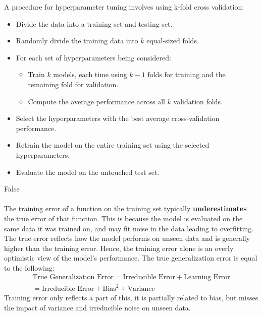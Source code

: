\documentclass{article}
\begin{document}
\begin{aprob}
\begin{tcolorbox}[colback=lightgray!10!white, colframe=black, title=A1.d]
        A procedure for hyperparameter tuning involves using k-fold cross validation: 
        \begin{itemize}
            \item Divide the data into a training set and testing set.
            \item Randomly divide the training data into \(k\) equal-sized folds.
            \item For each set of hyperparameters being considered:
            \begin{itemize}
                \item Train \(k\) models, each time using \(k{-}1\) folds for training and the remaining fold for validation.
                \item Compute the average performance across all \(k\) validation folds.
            \end{itemize}
            \item Select the hyperparameters with the best average cross-validation performance.
            \item Retrain the model on the entire training set using the selected hyperparameters.
            \item Evaluate the model on the untouched test set.
        \end{itemize}
    \end{tcolorbox}
    \begin{tcolorbox}[colback=lightgray!10!white, colframe=black, title=A1.e]
        False \\\\
        The training error of a function on the training set typically \textbf{underestimates} the true error of that function.
        This is because the model is evaluated on the same data it was trained on, and may fit noise in the data leading to overfitting.
        The true error reflects how the model performs on unseen data and is generally higher than the training error. Hence, the 
        training error alone is an overly optimistic view of the model's performance.
        The true generalization error is equal to the following:
        \begin{align*}
            \text{True Generalization Error} = \text{Irreducible Error} + \text{Learning Error} \\
            = \text{Irreducible Error} + \text{Bias}^2 + \text{Variance}
        \end{align*}
        Training error only reflects a part of this, it is partially related to bias, but misses the impact of variance and irreducible noise on unseen data.
        \end{tcolorbox}
        
\end{aprob}
\end{document}
